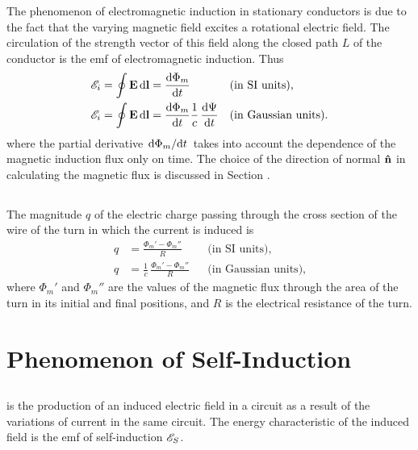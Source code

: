 The phenomenon of electromagnetic induction in stationary conductors is due to the fact that the varying magnetic field excites a rotational electric field. The circulation of the strength vector of this field along the closed path $L$ of the conductor  is the emf of electromagnetic induction. Thus
\begin{align*}%
\emf_{i} & = \oint \vb{E}\, \dd \vb{l} = \dv{\Phi_{m}}{t} &&  \text{(in SI units),} \\
\emf_{i} & = \oint \vb{E}\, \dd \vb{l} = \dv{\Phi_{m}}{t} \frac{1}{c}\,\dv{\Psi}{t} &&  \text{(in Gaussian units)}.
\end{align*}
where the partial derivative $\dv*{\Phi_{m}}{t}$ takes into account the dependence of the magnetic induction flux only on time. The choice of the direction of normal $\vu{n}$ in calculating the magnetic flux is discussed in Section .

\subsection{}\label{25.1.7} The magnitude $q$ of the electric charge passing through the cross section of the wire of the turn in which the current is induced is
\begin{align*}%
q & = \frac{\Phi_{m}' - \Phi_{m}''}{R} && \text{(in SI units),} \\
q & = \frac{1}{c} \, \frac{\Phi_{m}' - \Phi_{m}''}{R}  &&  \text{(in Gaussian units)},
\end{align*}
where $\Phi_{m}'$ and $\Phi_{m}''$ are the values of the magnetic flux through the area of the turn in its initial and final positions, and $R$ is the electrical resistance of the turn.


\section{Phenomenon of Self-Induction}
\label{sec-25.2}

\subsection{}\label{25.2.1}  is the production of an induced electric field in a circuit as a result of the variations of current in the same circuit. The energy characteristic of the induced field is the emf of self-induction $\mathscr{E}_{S}$.

